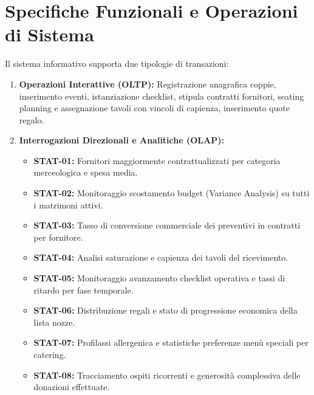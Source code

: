 \section{Specifiche Funzionali e Operazioni di Sistema}
Il sistema informativo supporta due tipologie di transazioni:
\begin{enumerate}
    \item \textbf{Operazioni Interattive (OLTP):} Registrazione anagrafica coppie, inserimento eventi, istanziazione checklist, stipula contratti fornitori, seating planning e assegnazione tavoli con vincoli di capienza, inserimento quote regalo.
    \item \textbf{Interrogazioni Direzionali e Analitiche (OLAP):}
    \begin{itemize}[noitemsep]
        \item \textbf{STAT-01:} Fornitori maggiormente contrattualizzati per categoria merceologica e spesa media.
        \item \textbf{STAT-02:} Monitoraggio scostamento budget (Variance Analysis) su tutti i matrimoni attivi.
        \item \textbf{STAT-03:} Tasso di conversione commerciale dei preventivi in contratti per fornitore.
        \item \textbf{STAT-04:} Analisi saturazione e capienza dei tavoli del ricevimento.
        \item \textbf{STAT-05:} Monitoraggio avanzamento checklist operativa e tassi di ritardo per fase temporale.
        \item \textbf{STAT-06:} Distribuzione regali e stato di progressione economica della lista nozze.
        \item \textbf{STAT-07:} Profilassi allergenica e statistiche preferenze menù speciali per catering.
        \item \textbf{STAT-08:} Tracciamento ospiti ricorrenti e generosità complessiva delle donazioni effettuate.
    \end{itemize}
\end{enumerate}
